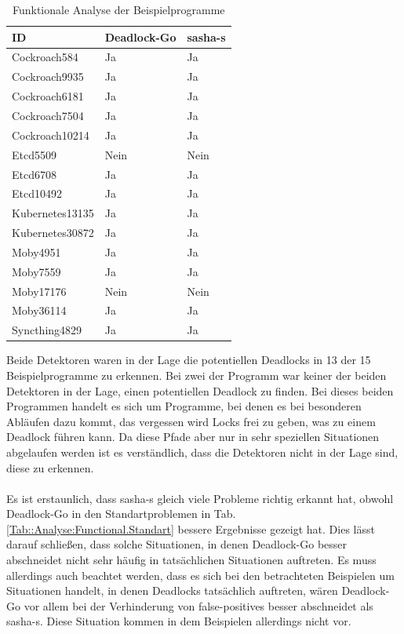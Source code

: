 \begin{table}[H]
\centering
\begin{tabular}{|l|l|l|}
\hline
\textbf{ID} & \textbf{Deadlock-Go} & \textbf{sasha-s} \\ \hline
Cockroach584 & Ja & Ja \\ \hline
Cockroach9935 & Ja & Ja \\ \hline
Cockroach6181 & Ja & Ja \\ \hline
Cockroach7504 & Ja & Ja \\ \hline
Cockroach10214 & Ja & Ja \\ \hline
Etcd5509 & Nein & Nein \\ \hline
Etcd6708 & Ja & Ja \\ \hline
Etcd10492 & Ja & Ja \\ \hline
Kubernetes13135 & Ja & Ja \\ \hline
Kubernetes30872 & Ja & Ja \\ \hline
Moby4951 & Ja & Ja \\ \hline
Moby7559 & Ja & Ja \\ \hline
Moby17176 & Nein & Nein \\ \hline
Moby36114 & Ja & Ja \\ \hline
Syncthing4829 & Ja & Ja \\ \hline
\end{tabular}
\caption{Funktionale Analyse der Beispielprogramme}
\label{Tab::Analyse:Functional.Example}
\end{table}
Beide Detektoren waren in der Lage die potentiellen Deadlocks in 13 der 15 
Beispielprogramme zu erkennen. Bei zwei der Programm war keiner der beiden Detektoren 
in der Lage, einen potentiellen Deadlock zu finden. Bei dieses beiden 
Programmen handelt es sich um Programme, bei denen es bei besonderen 
Abläufen dazu kommt, das vergessen wird Locks frei zu geben, was zu einem Deadlock 
führen kann. Da diese Pfade aber nur in sehr speziellen Situationen abgelaufen 
werden ist es verständlich, dass die Detektoren nicht in der Lage sind, diese 
zu erkennen.\\\\
Es ist erstaunlich, dass sasha-s gleich viele Probleme richtig erkannt hat, obwohl 
Deadlock-Go in den Standartproblemen in Tab. \ref{Tab::Analyse:Functional.Standart}
bessere Ergebnisse gezeigt hat. Dies lässt darauf schließen, dass solche 
Situationen, in denen Deadlock-Go besser abschneidet nicht sehr häufig 
in tatsächlichen Situationen auftreten. Es muss allerdings auch beachtet werden, 
dass es sich bei den betrachteten Beispielen um Situationen handelt, in denen
Deadlocks tatsächlich auftreten, wären Deadlock-Go vor allem bei der 
Verhinderung von false-positives besser abschneidet als sasha-s. Diese 
Situation kommen in dem Beispielen allerdings nicht vor.


